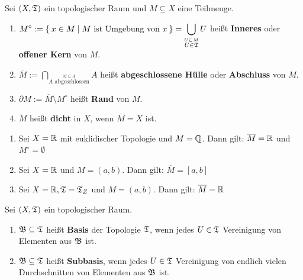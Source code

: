 \begin{definition}
    Sei $(X, \mathfrak{T})$ ein topologischer Raum und $M \subseteq X$ eine Teilmenge.
    \begin{enumerate}[label=\alph*)]
        \item $\displaystyle M^\circ := \Set{x \in M | M \text{ ist Umgebung von } x} = \bigcup_{\stackrel{U \subseteq M} {U \in \mathfrak{T}}} U $ heißt \textbf{Inneres} oder \textbf{ offener Kern} von $M$.  
        \item $\displaystyle \overline{M} := \bigcap_{\stackrel{M \subseteq A}{A \text{ abgeschlossen}}} A$ heißt \textbf{abgeschlossene Hülle} oder \textbf{Abschluss} von $M$. 
        \item $\partial M := \overline{M} \setminus M^\circ$ heißt \textbf{Rand} von $M$. 
        \item $M$ heißt \textbf{dicht} in $X$, wenn $\overline{M} = X$ ist. 
    \end{enumerate}
\end{definition}

\begin{beispiel}
    \begin{enumerate}[label=\arabic*)]
        \item Sei $X = \mathbb{R}$ mit euklidischer Topologie und 
              $M = \mathbb{Q}$. Dann gilt: $\overline{M} = \mathbb{R}$ und 
              $M^\circ = \emptyset$
        \item Sei $X = \mathbb{R}$ und $M=(a,b)$. Dann gilt: 
              $\overline{M} = [a,b]$
        \item Sei $X = \mathbb{R}, \mathfrak{T} = \mathfrak{T}_Z$ und $M = (a,b)$. Dann gilt:
              $\overline{M} = \mathbb{R}$
    \end{enumerate}
\end{beispiel}

\begin{definition}  
    Sei $(X, \mathfrak{T})$ ein topologischer Raum.
    \begin{enumerate}[label=\alph*)]
        \item $\mathfrak{B} \subseteq \mathfrak{T}$ heißt \textbf{Basis} der Topologie $\mathfrak{T}$,
              wenn jedes $U \in \mathfrak{T}$ Vereinigung von Elementen aus $\mathfrak{B}$
              ist.
        \item $\mathfrak{B} \subseteq \mathfrak{T}$ heißt \textbf{Subbasis}, wenn jedes
              $U \in \mathfrak{T}$ Vereinigung von endlich vielen Durchschnitten
              von Elementen aus $\mathfrak{B}$ ist.
    \end{enumerate}
\end{definition}

